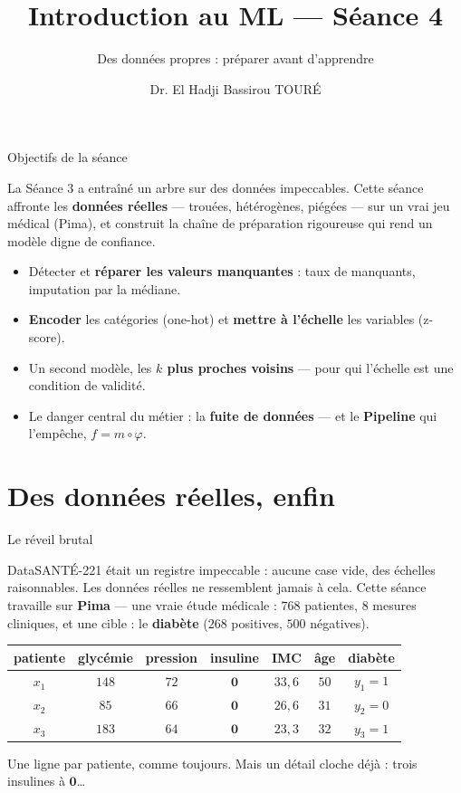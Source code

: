 \documentclass[aspectratio=169,11pt]{beamer}
\title{Introduction au ML — Séance 4}
\subtitle{Des données propres : préparer avant d'apprendre}
\author{Dr. El Hadji Bassirou TOURÉ}
\institute{Département de Mathématiques et Informatique\\ Faculté des Sciences et Techniques\\ Université Cheikh Anta Diop de Dakar}
\date{}
\begin{document}
\begin{frame}\titlepage\end{frame}

\begin{frame}{Objectifs de la séance}
\begin{ucaddef}[Contenu]
{\small La Séance 3 a entraîné un arbre sur des données impeccables. Cette séance affronte les \textbf{données réelles} — trouées, hétérogènes, piégées — sur un vrai jeu médical (Pima), et construit la chaîne de préparation rigoureuse qui rend un modèle digne de confiance.}
\end{ucaddef}
\begin{itemize}\small
  \item Détecter et \textbf{réparer les valeurs manquantes} : taux de manquants, imputation par la médiane.
  \item \textbf{Encoder} les catégories (one-hot) et \textbf{mettre à l'échelle} les variables (z-score).
  \item Un second modèle, les \textbf{$k$ plus proches voisins} — pour qui l'échelle est une condition de validité.
  \item Le danger central du métier : la \textbf{fuite de données} — et le \textbf{Pipeline} qui l'empêche, $f = m \circ \varphi$.
\end{itemize}
\end{frame}

\section{Des données réelles, enfin}

\begin{frame}{Le réveil brutal}
\begin{ucadfront}
{\small DataSANTÉ-221 était un registre impeccable : aucune case vide, des échelles raisonnables. Les données réelles ne ressemblent jamais à cela. Cette séance travaille sur \textbf{Pima} — une vraie étude médicale : $768$ patientes, $8$ mesures cliniques, et une cible : le \textbf{diabète} ($268$ positives, $500$ négatives).}
\end{ucadfront}
\begin{ucadex}
{\footnotesize \renewcommand{\arraystretch}{1.05}\begin{tabular}{c|ccccc|c}
patiente & glycémie & pression & insuline & IMC & âge & diabète\\\hline
$x_1$ & $148$ & $72$ & $\mathbf{0}$ & $33{,}6$ & $50$ & $y_1 = 1$\\
$x_2$ & $85$ & $66$ & $\mathbf{0}$ & $26{,}6$ & $31$ & $y_2 = 0$\\
$x_3$ & $183$ & $64$ & $\mathbf{0}$ & $23{,}3$ & $32$ & $y_3 = 1$\\
\end{tabular}}
\end{ucadex}
{\small Une ligne par patiente, comme toujours. Mais un détail cloche déjà : trois insulines à $\mathbf{0}$\dots}
\end{frame}
\end{document}
